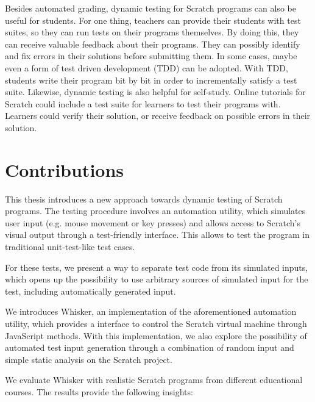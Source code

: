 Besides automated grading, dynamic testing for Scratch programs can also be useful for students.
For one thing, teachers can provide their students with test suites, so they can run tests on their programs themselves.
By doing this, they can receive valuable feedback about their programs.
They can possibly identify and fix errors in their solutions before submitting them.
In some cases, maybe even a form of test driven development (TDD) can be adopted.
With TDD, students write their program bit by bit in order to incrementally satisfy a test suite.
Likewise, dynamic testing is also helpful for self-study.
Online tutorials for Scratch could include a test suite for learners to test their programs with.
Learners could verify their solution, or receive feedback on possible errors in their solution.


\section{Contributions}
This thesis introduces a new approach towards dynamic testing of Scratch programs.
The testing procedure involves an automation utility, which simulates user input (e.g. mouse movement or key presses) and allows access to Scratch's visual output through a test-friendly interface.
This allows to test the program in traditional unit-test-like test cases.
\parspace

For these tests, we present a way to separate test code from its simulated inputs,
which opens up the possibility to use arbitrary sources of simulated input for the test,
including automatically generated input.
\parspace

We introduces Whisker, an implementation of the aforementioned automation utility,
which provides a interface to control the Scratch virtual machine through JavaScript methods.
With this implementation, we also explore the possibility of automated test input generation through a combination of random input and simple static analysis on the Scratch project.
\parspace

We evaluate Whisker with realistic Scratch programs from different educational courses.
The results provide the following insights:

